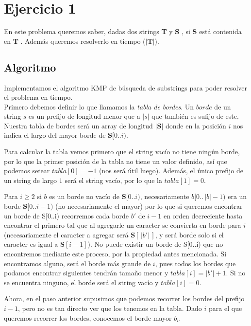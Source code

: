 \section{Ejercicio 1}

\newcommand\sS{ \textbf{S} }
\newcommand\sT{ \textbf{T} }

En este problema queremos saber, dadas dos strings \sT y \sS, si \sS está contenida en \sT. Además queremos resolverlo en tiempo \bigo($|\sT|$).

\subsection{Algoritmo}

Implementamos el algoritmo KMP de búsqueda de substrings para poder resolver el problema en tiempo.
\\

Primero debemos definir lo que llamamos la \textit{tabla de bordes}. Un $borde$ de un string $s$ es un prefijo de longitud menor que a $|s|$ que también es sufijo de este. Nuestra tabla de bordes será un array de longitud $|\sS|$ donde en la posición $i$ nos indica el largo del mayor borde de $\sS[0..i)$.

    Para calcular la tabla vemos primero que el string vacío no tiene ningún borde, por lo que la primer posición de la tabla no tiene un valor definido, así que podemos setear $tabla[0] = -1$ (nos será útil luego). Además, el único prefijo de un string de largo $1$ será el string vacío, por lo que la $tabla[1] = 0$.

Para $i \geq 2$ si $b$ es un borde no vacío de $\sS[0..i)$, necesariamente $b[0.. \,|b|-1)$ era un borde $\sS[0..i-1)$ (no necesariamente el mayor) por lo que si queremos encontrar un borde de S[0..i) recorremos cada borde $b'$ de $i-1$ en orden decreciente hasta encontrar el primero tal que al agregarle un caracter se convierta en borde para $i$ (necesariamente el caracter a agregar será $\sS[ \,|b'|\, ]$, y será borde solo si el caracter es igual a $\sS[i-1]$).
No puede existir un borde de S[0..i) que no encontremos mediante este proceso, por la propiedad antes mencionada.
Si encontramos alguno, será el borde más grande de $i$, pues todos los bordes que podamos encontrar siguientes tendrán tamaño menor y $tabla[i] = |b'| + 1$. Si no se encuentra ninguno, el borde será el string vacío y $tabla[i] = 0$.

Ahora, en el paso anterior supusimos que podemos recorrer los bordes del prefijo $i-1$, pero no es tan directo ver que los tenemos en la tabla. Dado $i$ para el que queremos recorrer los bordes, conocemos el borde mayor $b_i$.

